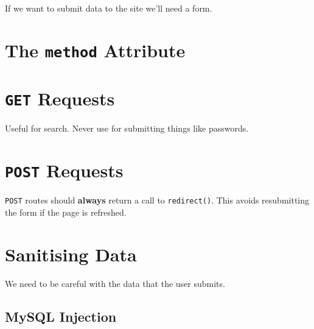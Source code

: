 If we want to submit data to the site we'll need a form.

\section{The \texttt{method} Attribute}

\section{\texttt{GET} Requests}

Useful for search. Never use for submitting things like passwords.

\section{\texttt{POST} Requests}

\texttt{POST} routes should \textbf{always} return a call to \texttt{redirect()}. This avoids resubmitting the form if the page is refreshed.



\section{Sanitising Data}

We need to be careful with the data that the user submits.

\subsection{MySQL Injection}
